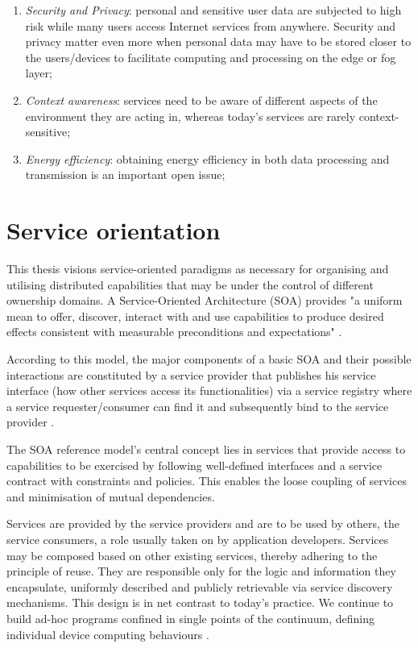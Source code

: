 \begin{enumerate}
    \item \emph{Security and Privacy}: personal and sensitive user data are subjected to high risk while many users access Internet services from anywhere. Security and privacy matter even more when personal data may have to be stored closer to the users/devices to facilitate computing and processing on the edge or fog layer;
    \item \emph{Context awareness}: services need to be aware of different aspects of the environment they are acting in, whereas today's services are rarely context-sensitive;
    \item \emph{Energy efficiency}: obtaining energy efficiency in both data processing and transmission is an important open issue;
\end{enumerate}

\section{Service orientation}

This thesis visions service-oriented paradigms as necessary for organising and utilising distributed capabilities that may be under the control of different ownership domains. A Service-Oriented Architecture (SOA) provides "a uniform mean to offer, discover, interact with and use capabilities to produce desired effects consistent with measurable preconditions and expectations" \cite{oasis}.

According to this model, the major components of a basic SOA and their possible interactions are constituted by a service provider that publishes his service interface (how other services access its functionalities) via a service registry where a service requester/consumer can find it and subsequently bind to the service provider \cite{iot-enterprise}.

The SOA reference model's central concept lies in services that provide access to capabilities to be exercised by following well-defined interfaces and a service contract with constraints and policies. This enables the loose coupling of services and minimisation of mutual dependencies.

Services are provided by the service providers and are to be used by others, the service consumers, a role usually taken on by application developers. Services may be composed based on other existing services, thereby adhering to the principle of reuse. They are responsible only for the logic and information they encapsulate, uniformly described and publicly retrievable via service discovery mechanisms. This design is in net contrast to today's practice. We continue to build ad-hoc programs confined in single points of the continuum, defining individual device computing behaviours \cite{harnessing-continuum}.

